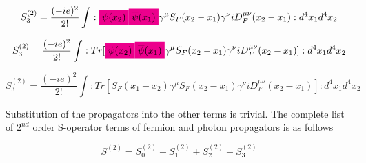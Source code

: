 \documentclass[a4]{article}
\newcommand{\highlight}[2][yellow]{\mathchoice
  {\colorbox{#1}{$\displaystyle#2$}}
  {\colorbox{#1}{$\textstyle#2$}}
  {\colorbox{#1}{$\scriptstyle#2$}}
  {\colorbox{#1}{$\scriptscriptstyle#2$}}}
\begin{document}
        \begin{equation}
            S^{(2)}_{3} = \frac{(-ie)^2}{2!} \int :\highlight[magenta]{\psi (x_2)} \highlight[magenta]{\overline{\psi} (x_1)} \gamma^{\mu} S_{F} (x_2 - x_1) \gamma^{\nu} i D_{F}^{\mu\nu} (x_2 - x_1): d^{4} x_{1} d^{4} x_{2}
        \end{equation}

        \begin{equation}
            S^{(2)}_{3} = \frac{(-ie)^2}{2!} \int :Tr[\highlight[magenta]{\psi (x_2)} \highlight[magenta]{\overline{\psi} (x_1)} \gamma^{\mu} S_{F} (x_2 - x_1) \gamma^{\nu} i D_{F}^{\mu\nu} (x_2 - x_1)]: d^{4} x_{1} d^{4} x_{2}
        \end{equation}

        \begin{framed}
            \begin{equation}
                S^{(2)}_{3} = \frac{(-ie)^2}{2!} \int :Tr[S_{F} (x_1 - x_2) \gamma^{\mu} S_{F} (x_2 - x_1) \gamma^{\nu} i D_{F}^{\mu\nu} (x_2 - x_1)]: d^{4} x_{1} d^{4} x_{2}
            \end{equation}    
        \end{framed}

        Substitution of the propagators into the other terms is trivial. The complete list of $2^{nd}$ order S-operator terms of fermion and photon propagators is as follows

        \begin{equation}
            S^{(2)} = S^{(2)}_{0} + S^{(2)}_{1} + S^{(2)}_{2} + S^{(2)}_{3}
        \end{equation}
\end{document}
